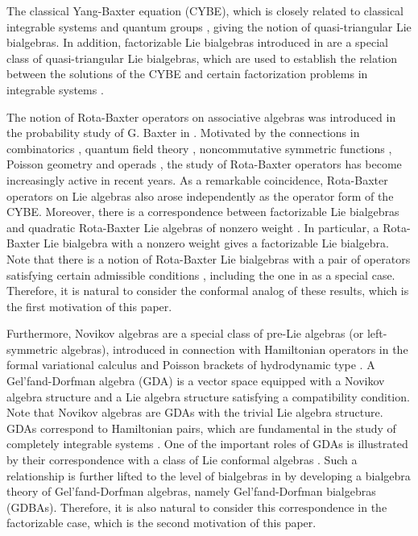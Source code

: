 \documentclass[12pt]{amsart}
\begin{document}
    The classical Yang-Baxter equation (CYBE), which is closely related to classical integrable systems and quantum groups \cite{CP,STS},  giving the notion of quasi-triangular
     Lie bialgebras.  In addition, factorizable Lie bialgebras introduced in \cite{RS} are a special class of quasi-triangular Lie bialgebras, which are used to establish the
     relation between the solutions of the CYBE and certain factorization problems in integrable systems \cite{STS2}.

    The notion of Rota-Baxter operators on associative algebras was introduced in the probability study of G. Baxter in \cite{B}. Motivated by the connections in combinatorics \cite{R}, %
    quantum field theory \cite{CK2}, noncommutative symmetric functions \cite{YGT}, %
    Poisson geometry \cite{U,S} %
    and operads \cite{BBGN}, %
    the study of Rota-Baxter operators has
    become increasingly active in recent years. As a remarkable coincidence, Rota-Baxter operators on Lie algebras also arose independently as the  operator form
    of the CYBE. Moreover, there is a correspondence
    between factorizable Lie bialgebras and quadratic Rota-Baxter Lie algebras of nonzero weight
    \cite{LS}. In particular, a Rota-Baxter
Lie bialgebra with a nonzero weight \cite{LS} gives a factorizable
Lie bialgebra. Note that there is a notion of Rota-Baxter Lie
bialgebras with a pair of operators satisfying certain admissible
conditions \cite{BGLM}, including the one in \cite{LS} as a
special case. Therefore, it is natural to consider the conformal
analog of
 these results, which is the first motivation of
this paper.

 Furthermore, Novikov algebras are a special class of pre-Lie algebras (or left-symmetric algebras), introduced in connection with Hamiltonian operators in the formal variational calculus \cite{GD1,GD2}
 and Poisson brackets of hydrodynamic type \cite{BN}. A Gel'fand-Dorfman algebra (GDA) is a vector space equipped with a Novikov algebra structure and a Lie algebra structure satisfying a compatibility condition.
 Note that Novikov algebras are GDAs with the trivial Lie algebra structure. GDAs correspond to Hamiltonian pairs, which are fundamental in the study of completely integrable systems \cite{GD1}. 
One of the important roles of GDAs is illustrated by their
correspondence with a class of Lie conformal algebras \cite{X}.
Such a relationship is further lifted to the level of bialgebras
in \cite{HBG} by developing a bialgebra theory  of
Gel'fand-Dorfman algebras, namely  Gel'fand-Dorfman bialgebras
(GDBAs). Therefore,        it is also natural to consider this
correspondence in the factorizable case, which is the second
motivation of this paper.
\end{document}
